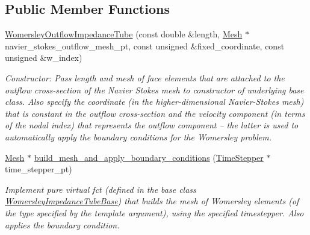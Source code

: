 \subsection*{Public Member Functions}
\begin{DoxyCompactItemize}
\item 
\hyperlink{classoomph_1_1WomersleyOutflowImpedanceTube_a43c6028b6a11ae3c73b26271f0176c58}{Womersley\+Outflow\+Impedance\+Tube} (const double \&length, \hyperlink{classoomph_1_1Mesh}{Mesh} $\ast$navier\+\_\+stokes\+\_\+outflow\+\_\+mesh\+\_\+pt, const unsigned \&fixed\+\_\+coordinate, const unsigned \&w\+\_\+index)
\begin{DoxyCompactList}\small\item\em Constructor\+: Pass length and mesh of face elements that are attached to the outflow cross-\/section of the Navier Stokes mesh to constructor of underlying base class. Also specify the coordinate (in the higher-\/dimensional Navier-\/\+Stokes mesh) that is constant in the outflow cross-\/section and the velocity component (in terms of the nodal index) that represents the outflow component -- the latter is used to automatically apply the boundary conditions for the Womersley problem. \end{DoxyCompactList}\item 
\hyperlink{classoomph_1_1Mesh}{Mesh} $\ast$ \hyperlink{classoomph_1_1WomersleyOutflowImpedanceTube_a31655c396b473246a6a9840d789dc046}{build\+\_\+mesh\+\_\+and\+\_\+apply\+\_\+boundary\+\_\+conditions} (\hyperlink{classoomph_1_1TimeStepper}{Time\+Stepper} $\ast$time\+\_\+stepper\+\_\+pt)
\begin{DoxyCompactList}\small\item\em Implement pure virtual fct (defined in the base class \hyperlink{classoomph_1_1WomersleyImpedanceTubeBase}{Womersley\+Impedance\+Tube\+Base}) that builds the mesh of Womersley elements (of the type specified by the template argument), using the specified timestepper. Also applies the boundary condition. \end{DoxyCompactList}\end{DoxyCompactItemize}
